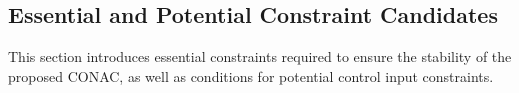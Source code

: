 \documentclass[journal]{IEEEtran}
\begin{document}


\subsection{Essential and Potential Constraint Candidates}\label{sec:sub:cstr} 

This section introduces essential constraints required to ensure the stability of the proposed CONAC, as well as conditions for potential control input constraints.
\end{document}
